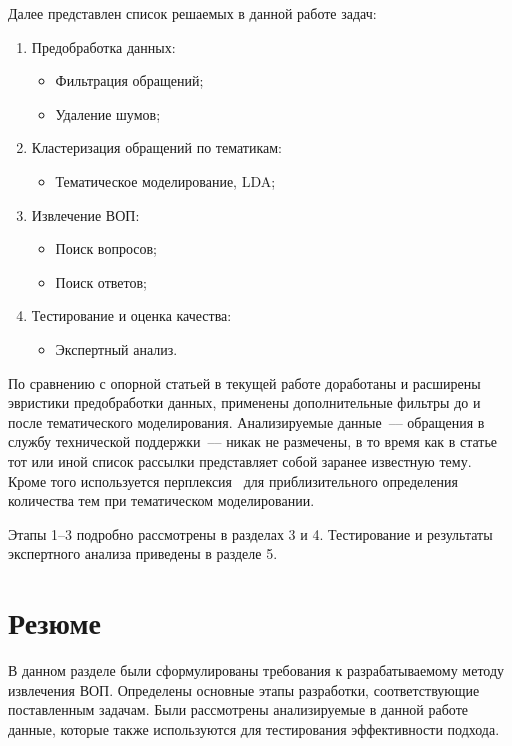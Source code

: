 Далее представлен список решаемых в данной работе задач:

\begin{enumerate}
\item Предобработка данных:
\begin{itemize}
\item Фильтрация обращений;
\item Удаление шумов;
\end{itemize}
\item Кластеризация обращений по тематикам:
\begin{itemize}
\item Тематическое моделирование, LDA;
\end{itemize}
\item Извлечение ВОП:
\begin{itemize}
\item Поиск вопросов;
\item Поиск ответов;
\end{itemize}
\item Тестирование и оценка качества:
\begin{itemize}
\item Экспертный анализ.
\end{itemize}
\end{enumerate}

По сравнению с опорной статьей в текущей работе доработаны и расширены эвристики предобработки данных, применены дополнительные фильтры до и после тематического моделирования. Анализируемые данные~--– обращения в службу технической поддержки~--– никак не размечены, в то время как в статье~\cite{original} тот или иной список рассылки представляет собой заранее известную тему. Кроме того используется перплексия~\cite{LDA} для приблизительного определения количества тем при тематическом моделировании.

Этапы 1--3 подробно рассмотрены в разделах 3 и 4. Тестирование и результаты экспертного анализа приведены в разделе 5.

\section{Резюме}
\label{sec:task_concl}

В данном разделе были сформулированы требования к разрабатываемому методу извлечения ВОП. Определены основные этапы разработки, соответствующие поставленным задачам. Были рассмотрены анализируемые в данной работе данные, которые также используются для тестирования эффективности подхода.